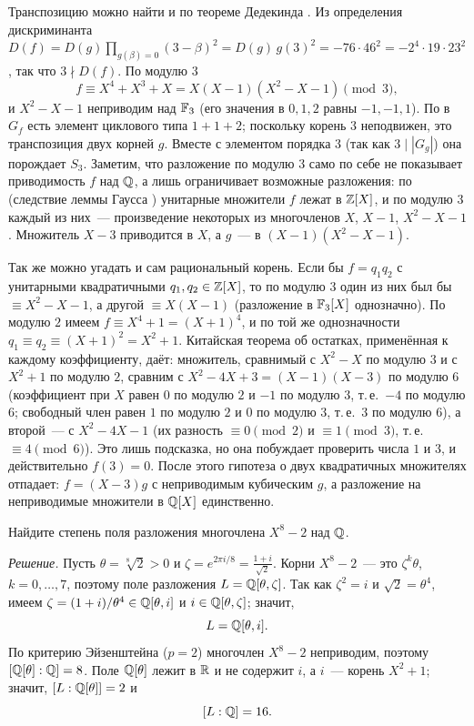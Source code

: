 \begin{remark}
Транспозицию можно найти и по теореме Дедекинда . Из определения дискриминанта
$D(f)=D(g)\prod_{g(\beta)=0}(3-\beta)^2=D(g)\,g(3)^2=-76\cdot46^2=-2^4\cdot19\cdot23^2$, так что $3\nmid D(f)$. По модулю $3$
\[
f\equiv X^4+X^3+X=X(X-1)(X^2-X-1)\pmod 3,
\]
и $X^2-X-1$ неприводим над $\mathbb F_3$ (его значения в $0,1,2$ равны $-1,-1,1$). По  в $G_f$ есть элемент циклового типа
$1+1+2$; поскольку корень $3$ неподвижен, это транспозиция двух корней $g$. Вместе с элементом порядка $3$ (так как
$3\mid|G_g|$) она порождает $S_3$. Заметим, что разложение по модулю $3$ само по себе не показывает приводимость $f$
над $\mathbb Q$, а лишь ограничивает возможные разложения: по  (следствие леммы Гаусса ) унитарные множители $f$ лежат в $\mathbb Z[X]$, и по
модулю $3$ каждый из них~--- произведение некоторых из многочленов $X$, $X-1$, $X^2-X-1$. Множитель $X-3$ приводится в
$X$, а $g$~--- в $(X-1)(X^2-X-1)$.

Так же можно угадать и сам рациональный корень. Если бы $f=q_1q_2$ с унитарными квадратичными $q_1,q_2\in\mathbb Z[X]$, то по
модулю $3$ один из них был бы $\equiv X^2-X-1$, а другой $\equiv X(X-1)$ (разложение в $\mathbb F_3[X]$ однозначно). По модулю $2$
имеем $f\equiv X^4+1=(X+1)^4$, и по той же однозначности $q_1\equiv q_2\equiv(X+1)^2=X^2+1$. Китайская теорема об остатках,
применённая к каждому коэффициенту, даёт: множитель, сравнимый с $X^2-X$ по модулю $3$ и с $X^2+1$ по модулю $2$, сравним с
$X^2-4X+3=(X-1)(X-3)$ по модулю $6$ (коэффициент при $X$ равен $0$ по модулю $2$ и $-1$ по модулю $3$, т.\,е.\ $-4$ по
модулю $6$; свободный член равен $1$ по модулю $2$ и $0$ по модулю $3$, т.\,е.\ $3$ по модулю $6$), а второй~--- с
$X^2-4X-1$ (их разность $\equiv0\pmod2$ и $\equiv1\pmod3$, т.\,е.\ $\equiv4\pmod6$). Это лишь подсказка, но
она побуждает проверить числа $1$ и $3$, и действительно $f(3)=0$. После этого гипотеза о двух квадратичных множителях
отпадает: $f=(X-3)g$ с неприводимым кубическим $g$, а разложение на неприводимые множители в $\mathbb Q[X]$ единственно.
\end{remark}

\begin{exercise}[4-3]
Найдите степень поля разложения многочлена $X^8-2$ над $\mathbb Q$.
\end{exercise}

\noindent\emph{Решение.} Пусть $\theta=\sqrt[8]2>0$ и $\zeta=e^{2\pi i/8}=\frac{1+i}{\sqrt2}$. Корни $X^8-2$~--- это
$\zeta^k\theta$, $k=0,\dots,7$, поэтому поле разложения $L=\mathbb Q[\theta,\zeta]$. Так как $\zeta^2=i$ и $\sqrt2=\theta^4$, имеем
$\zeta=(1+i)/\theta^4\in\mathbb Q[\theta,i]$ и $i\in\mathbb Q[\theta,\zeta]$; значит,
\[
L=\mathbb Q[\theta,i].
\]
По критерию Эйзенштейна ($p=2$) многочлен $X^8-2$ неприводим, поэтому $[\mathbb Q[\theta]:\mathbb Q]=8$. Поле $\mathbb Q[\theta]$ лежит в
$\mathbb R$ и не содержит $i$, а $i$~--- корень $X^2+1$; значит, $[L:\mathbb Q[\theta]]=2$ и
\[
[L:\mathbb Q]=16 .
\]

